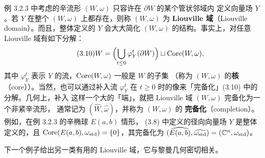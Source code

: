 
例 3.2.3 中考虑的辛流形 $(W,\omega)$ 只容许在 $\partial W$ 的某个管状邻域内
定义向量场 $Y$。若 $Y$ 在整个 $(W,\omega)$ 上都存在，则称 $(W,\omega)$ 为
\textbf{Liouville 域}（Liouville domain）。而且，整体定义的 $Y$ 会大大简化
$(W,\omega)$ 的结构。事实上，对任意 Liouville 域有如下分解：
\begin{equation}\tag{3.10}
  W=\Bigl(\bigcup_{t\le0}\varphi^t_Y(\partial W)\Bigr)\sqcup
  \operatorname{Core}(W,\omega),
\end{equation}
其中 $\varphi^t_Y$ 表示 $Y$ 的流，$\operatorname{Core}(W,\omega)$ 一般是 $W$ 的子集
（称为 $(W,\omega)$ 的\textbf{核}（core））。当然，也可以通过补入流
$\varphi^t_Y$ 在 $t\ge0$ 时的像来「完备化」(3.10) 中的分解。几何上，补入
这样一个大的「端」，就把 Liouville 域 $(W,\omega)$ 完备化为一个非紧辛流形，
通常记为 $(\widehat W,\widehat\omega)$，并称为 $(W,\omega)$ 的
\textbf{完备化}（completion）。例如，在例 3.2.3 的辛椭球 $E(a,b)$ 情形，
(3.8) 中定义的径向向量场 $Y$ 是整体定义的，且
$\operatorname{Core}(E(a,b),\omega_{\mathrm{std}})=\{0\}$，其完备化为
$(\widehat{E(a,b)},\widehat{\omega_{\mathrm{std}}})=(\mathbb{C}^n,\omega_{\mathrm{std}})$。


下一个例子给出另一类有用的 Liouville 域，它与黎曼几何密切相关。

